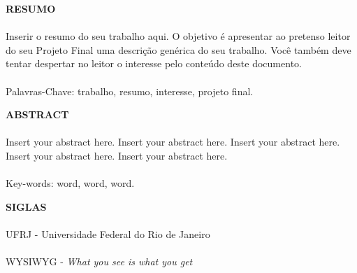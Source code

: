 \pagebreak


\begin{center}
\textbf{RESUMO}
\end{center}
      \vspace{0.5cm}

\paragraph{}Inserir o resumo do seu trabalho aqui. O objetivo é apresentar ao pretenso leitor do seu Projeto Final uma descrição genérica do seu trabalho. Você também deve tentar despertar no leitor o interesse pelo conteúdo deste documento.
\paragraph{}
\noindent Palavras-Chave: trabalho, resumo, interesse, projeto final.

\pagebreak


\begin{center}
\textbf{ABSTRACT}
\end{center}
      \vspace{0.5cm}

\paragraph{}Insert your abstract here. Insert your abstract here. Insert your abstract here. Insert your abstract here. Insert your abstract here.
\paragraph{}
\noindent Key-words: word, word, word.

\pagebreak


\begin{center}
\textbf{SIGLAS}
\end{center}
      \vspace{0.5cm}

\paragraph{}UFRJ - Universidade Federal do Rio de Janeiro 
\paragraph{}WYSIWYG - \textit{What you see is what you get} 


\pagebreak








